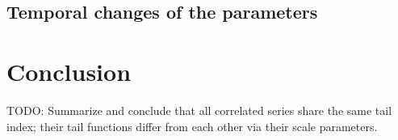 \documentclass{article}
\begin{document}



\subsection{Temporal changes of the parameters}













\section{Conclusion}
TODO: Summarize and conclude that all correlated series share the same
tail index; their tail functions differ from each other via their
scale parameters.



\end{document}
